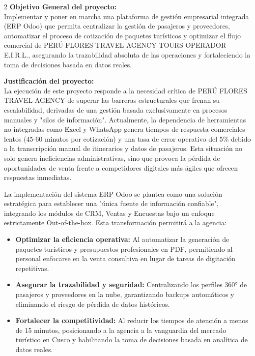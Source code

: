 \documentclass[12pt]{article}
\begin{document}
\begin{multicols}{2}
\textbf{Objetivo General del proyecto:}\\
Implementar y poner en marcha una plataforma de gestión empresarial integrada (ERP Odoo) que permita centralizar la gestión de pasajeros y proveedores, automatizar el proceso de cotización de paquetes turísticos y optimizar el flujo comercial de PERÚ FLORES TRAVEL AGENCY TOURS OPERADOR E.I.R.L., asegurando la trazabilidad absoluta de las operaciones y fortaleciendo la toma de decisiones basada en datos reales.

\textbf{Justificación del proyecto:}\\
La ejecución de este proyecto responde a la necesidad crítica de PERÚ FLORES TRAVEL AGENCY de superar las barreras estructurales que frenan su escalabilidad, derivadas de una gestión basada exclusivamente en procesos manuales y "silos de información". Actualmente, la dependencia de herramientas no integradas como Excel y WhatsApp genera tiempos de respuesta comerciales lentos (45-60 minutos por cotización) y una tasa de error operativo del 5\% debido a la transcripción manual de itinerarios y datos de pasajeros. Esta situación no solo genera ineficiencias administrativas, sino que provoca la pérdida de oportunidades de venta frente a competidores digitales más ágiles que ofrecen respuestas inmediatas.

La implementación del sistema ERP Odoo se plantea como una solución estratégica para establecer una "única fuente de información confiable", integrando los módulos de CRM, Ventas y Encuestas bajo un enfoque estrictamente Out-of-the-box. Esta transformación permitirá a la agencia:
\begin{itemize}
    \item \textbf{Optimizar la eficiencia operativa:} Al automatizar la generación de paquetes turísticos y presupuestos profesionales en PDF, permitiendo al personal enfocarse en la venta consultiva en lugar de tareas de digitación repetitivas.
    \item \textbf{Asegurar la trazabilidad y seguridad:} Centralizando los perfiles 360° de pasajeros y proveedores en la nube, garantizando backups automáticos y eliminando el riesgo de pérdida de datos históricos.
    \item \textbf{Fortalecer la competitividad:} Al reducir los tiempos de atención a menos de 15 minutos, posicionando a la agencia a la vanguardia del mercado turístico en Cusco y habilitando la toma de decisiones basada en analítica de datos reales.
\end{itemize}


\end{multicols}
\end{document}
